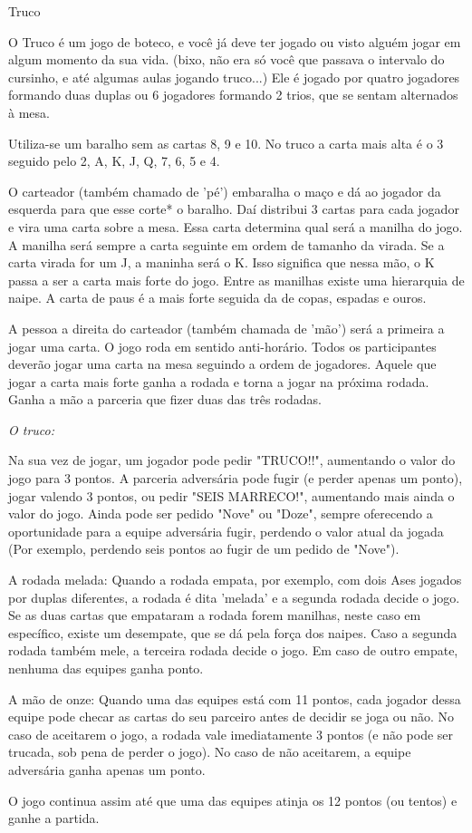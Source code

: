 \begin{subsecao}{Truco}

O Truco é um jogo de boteco, e você já deve ter jogado ou visto alguém jogar em
algum momento da sua vida. (bixo, não era só você que passava o intervalo do
cursinho, e até algumas aulas jogando truco...) Ele é jogado por quatro
jogadores formando duas duplas ou 6 jogadores formando 2 trios, que se sentam
alternados à mesa.

Utiliza-se um baralho sem as cartas 8, 9 e 10. No truco a carta mais alta é o 3
seguido pelo 2, A, K, J, Q, 7, 6, 5 e 4. 

O carteador (também chamado de 'pé') embaralha o maço e dá ao jogador da
esquerda para que esse corte* o baralho. Daí distribui 3 cartas para cada
jogador e vira uma carta sobre a mesa. Essa carta determina qual será a manilha
do jogo. A manilha será sempre a carta seguinte em ordem de tamanho da virada.
Se a carta virada for um J, a maninha será o K. Isso significa que nessa mão, o
K passa a ser a carta mais forte do jogo. Entre as manilhas existe uma
hierarquia de naipe. A carta de paus é a mais forte seguida da de copas,
espadas e ouros.

A pessoa a direita do carteador (também chamada de 'mão') será a primeira a
jogar uma carta. O jogo roda em sentido anti-horário. Todos os participantes
deverão jogar uma carta na mesa seguindo a ordem de jogadores. Aquele que jogar
a carta mais forte ganha a rodada e torna a jogar na próxima rodada. Ganha a
mão a parceria que fizer duas das três rodadas.

\textit{O truco:}

Na sua vez de jogar, um jogador pode pedir "TRUCO!!", aumentando o valor do
jogo para 3 pontos. A parceria adversária pode fugir (e perder apenas um
ponto), jogar valendo 3 pontos, ou pedir "SEIS MARRECO!", aumentando mais ainda
o valor do jogo. Ainda pode ser pedido "Nove" ou "Doze", sempre oferecendo a
oportunidade para a equipe adversária fugir, perdendo o valor atual da
jogada (Por exemplo, perdendo seis pontos ao fugir de um pedido de "Nove"). 

A rodada melada: Quando a rodada empata, por exemplo, com dois Ases jogados por
duplas diferentes, a rodada é dita 'melada' e a segunda rodada decide o jogo.
Se as duas cartas que empataram a rodada forem manilhas, neste caso em
específico, existe um desempate, que se dá pela força dos naipes.  Caso a
segunda rodada também mele, a terceira rodada decide o jogo. Em caso de outro
empate, nenhuma das equipes ganha ponto. 

A mão de onze: Quando uma das equipes está com 11 pontos, cada jogador dessa
equipe pode checar as cartas do seu parceiro antes de decidir se joga ou não.
No caso de aceitarem o jogo, a rodada vale imediatamente 3 pontos (e não pode
ser trucada, sob pena de perder o jogo). No caso de não aceitarem, a equipe
adversária ganha apenas um ponto. 

O jogo continua assim até que uma das equipes atinja os 12 pontos (ou tentos) e
ganhe a partida. 

\end{subsecao}
